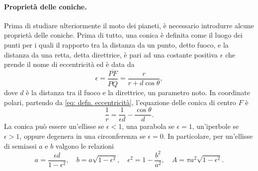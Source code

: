 \paragraph{Proprietà delle coniche.} Prima di studiare ulteriormente il moto dei pianeti, è necessario introdurre alcune proprietà delle coniche. Prima di tutto, una conica è definita come il luogo dei punti per i quali il rapporto tra la distanza da un punto, detto fuoco, e la distanza da una retta, detta direttrice, è pari ad una costante positiva $\epsilon$ che prende il nome di eccentricità ed è data da
\begin{equation}
\label{eq: defn. eccentricità}
    \epsilon=\frac{\overline{PF}}{\overline{PQ}}=\frac{r}{r+d\cos\theta},
\end{equation}
dove $d$ è la distanza tra il fuoco e la direttrice, un parametro noto. In coordinate polari, partendo da \eqref{eq: defn. eccentricità}, l'equazione delle conica di centro $F$ è
\begin{equation}
\label{eq: eqzn. coniche}
    \frac{1}{r}=\frac{1}{\epsilon d}-\frac{\cos\theta}{d}.
\end{equation}
La conica può essere un'ellisse se $\epsilon<1$, una parabola se $\epsilon=1$, un'iperbole se $\epsilon>1$, oppure degenera in una circonferenza se $\epsilon=0$. In particolare, per un'ellisse di semiassi $a$ e $b$ valgono le relazioni
\begin{equation}
\label{eq: relazioni ellisse}
    a=\frac{\epsilon d}{1-\epsilon^2},\quad b=a\sqrt{1-\epsilon^2},\quad\epsilon^2=1-\frac{b^2}{a^2},\quad A=\pi a^2\sqrt{1-\epsilon^2}.
\end{equation}

